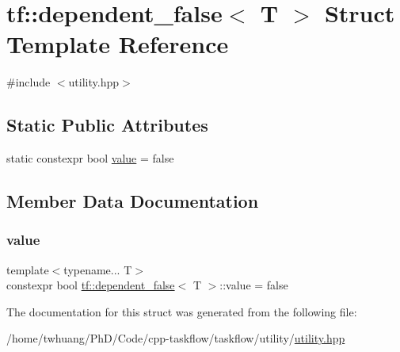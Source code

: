 \hypertarget{structtf_1_1dependent__false}{}\section{tf\+:\+:dependent\+\_\+false$<$ T $>$ Struct Template Reference}
\label{structtf_1_1dependent__false}


{\ttfamily \#include $<$utility.\+hpp$>$}

\subsection*{Static Public Attributes}
\begin{DoxyCompactItemize}
\item 
static constexpr bool \hyperlink{structtf_1_1dependent__false_a84f8288ae187aa71e02e51d9d3f0b328}{value} = false
\end{DoxyCompactItemize}


\subsection{Member Data Documentation}
\mbox{\label{structtf_1_1dependent__false_a84f8288ae187aa71e02e51d9d3f0b328}} 
\subsubsection{\texorpdfstring{value}{value}}
{\footnotesize\ttfamily template$<$typename... T$>$ \\
constexpr bool \hyperlink{structtf_1_1dependent__false}{tf\+::dependent\+\_\+false}$<$ T $>$\+::value = false\hspace{0.3cm}{\ttfamily [static]}}



The documentation for this struct was generated from the following file\+:\begin{DoxyCompactItemize}
\item 
/home/twhuang/\+Ph\+D/\+Code/cpp-\/taskflow/taskflow/utility/\hyperlink{utility_8hpp}{utility.\+hpp}\end{DoxyCompactItemize}
